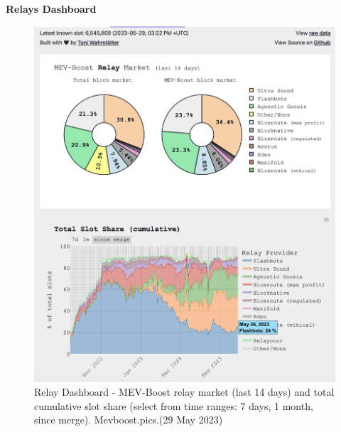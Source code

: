 \documentclass[UTF8]{article}
\begin{document}
\textbf{Relays Dashboard}
\begin{figure}[htbp]
\begin{center}
\includegraphics[width=0.85\linewidth]{images/mevrelay1}
\caption{Relay Dashboard - MEV-Boost relay market (last 14 days) and total cumulative slot share (select from time ranges: 7 days, 1 month, since merge). Mevboost.pics.(29 May 2023)}
\label{fig:mevrelay1}
\end{center}
\end{figure}
\end{document}
